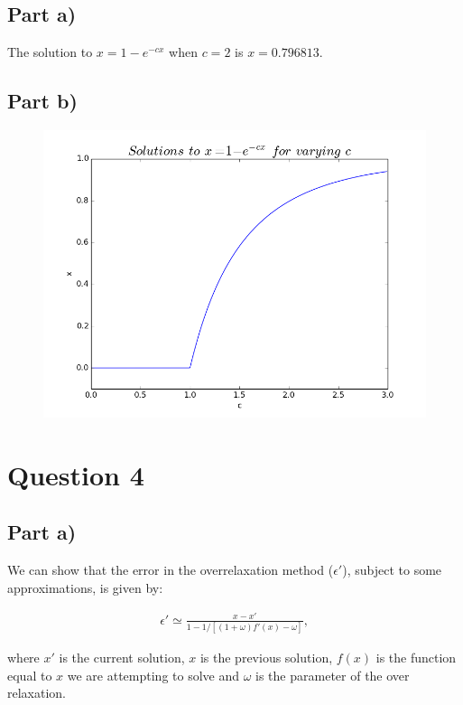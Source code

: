 \documentclass[a4paper,12pt]{article}
\begin{document}
\subsection{Part a)}

The solution to $x = 1 - e^{-cx}$ when $c = 2$ is $x = 0.796813$.

\subsection{Part b)}

\begin{figure}[H]
\centering
\includegraphics[width = \linewidth]{lab4q3b.png}
\caption{}
\label{fig:q3}
\end{figure}

\section{Question 4}

\subsection{Part a)}

We can show that the error in the overrelaxation method ($\epsilon '$), subject to some approximations, is given by:

\begin{eqnarray}
\epsilon'\simeq \frac{x-x'}{1 - 1/[(1+\omega)f'(x)-\omega]},\label{eqn:eps}
\end{eqnarray}

where $x'$ is the current solution, $x$ is the previous solution, $f(x)$ is the function equal to $x$ we are attempting to solve and $\omega$ is the parameter of the over relaxation.
\end{document}
